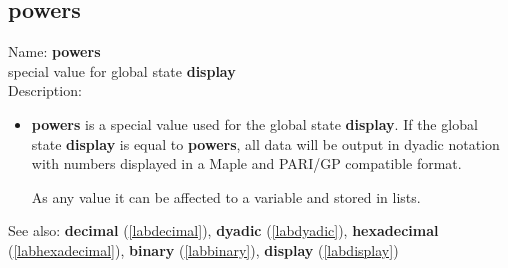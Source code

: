 \subsection{powers}
\label{labpowers}
\noindent Name: \textbf{powers}\\
special value for global state \textbf{display}\\
\noindent Description: \begin{itemize}

\item \textbf{powers} is a special value used for the global state \textbf{display}.  If
   the global state \textbf{display} is equal to \textbf{powers}, all data will be
   output in dyadic notation with numbers displayed in a Maple and
   PARI/GP compatible format.
    
   As any value it can be affected to a variable and stored in lists.
\end{itemize}
See also: \textbf{decimal} (\ref{labdecimal}), \textbf{dyadic} (\ref{labdyadic}), \textbf{hexadecimal} (\ref{labhexadecimal}), \textbf{binary} (\ref{labbinary}), \textbf{display} (\ref{labdisplay})
